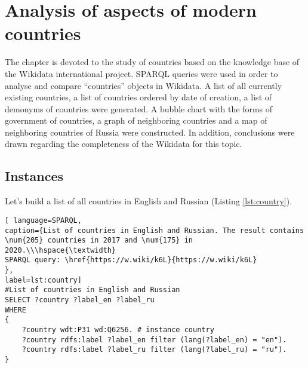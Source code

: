 \setchapterpreamble[u]{\margintoc}
\chapter{Analysis of aspects of modern countries\protect\footnotemark}


The chapter is devoted to the study of countries based on the knowledge base of the Wikidata international project. SPARQL queries were used in order to analyse and compare ``countries'' objects in Wikidata. A list of all currently existing countries, a list of countries ordered by date of creation, a list of demonyms of countries were generated. A bubble chart with the forms of government of countries, a graph of neighboring countries and a map of neighboring countries of Russia were constructed. In addition, conclusions were drawn regarding the completeness of the Wikidata for this topic.

\section{Instances}

Let's build a list of all countries in English and Russian (Listing \ref{lst:country}).

\begin{lstlisting}[ language=SPARQL, 
caption={List of countries in English and Russian. The result contains \num{205} countries in 2017 and \num{175} in 2020.\\\hspace{\textwidth}
SPARQL query: \href{https://w.wiki/k6L}{https://w.wiki/k6L}
},
label=lst:country]
#List of countries in English and Russian
SELECT ?country ?label_en ?label_ru
WHERE
{
	?country wdt:P31 wd:Q6256. # instance country
	?country rdfs:label ?label_en filter (lang(?label_en) = "en").
	?country rdfs:label ?label_ru filter (lang(?label_ru) = "ru").
}
\end{lstlisting}


\begin{marginfigure}[0.0cm]
	{
		\setlength{\fboxsep}{0pt}%
		\setlength{\fboxrule}{1pt}%
	}
    \caption[Number of properties of instances of the Wikidata object Country.]{%
		High degree of filling according to the number of properties of the Wikidata object \href{https://www.wikidata.org/wiki/Q6256}{Country (Q6256)}.  
		Data obtained using the service \href{https://prowd.id/dashboards/86b6f91a8131/profile}{ProWD.id}, 2020. \emph{The Gini coefficient is 0.091.}
	}%
	\label{fig:ProWD_country}%
\end{marginfigure}


